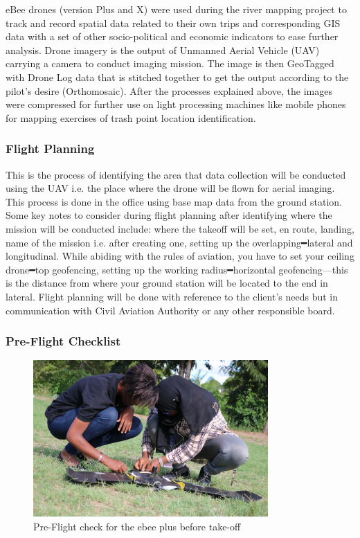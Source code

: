 \documentclass[a4paper,12pt,twoside]{article}
\begin{document}
    \begin{multicols}{2}
    eBee drones (version Plus and X) were used during the river mapping project to track and record spatial data related to their own trips and corresponding GIS data with a set of other socio-political and economic indicators to ease further analysis. Drone imagery is the output of Unmanned Aerial Vehicle (UAV) carrying a camera to conduct imaging mission. The image is then GeoTagged with Drone Log data that is stitched together to get the output according to the pilot’s desire (Orthomosaic). After the processes explained above, the images were compressed for further use on light processing machines like mobile phones for mapping exercises of trash point location identification.
    \end{multicols}
    
    \subsubsection{Flight Planning}
    This is the process of identifying the area that data collection will be conducted using the UAV i.e. the place where the drone will be flown for aerial imaging. This process is done in the office using base map data from the ground station. Some key notes to consider during flight planning after identifying where the mission will be conducted include: where the takeoff will be set, en route, landing, name of the mission i.e. after creating one, setting up the overlapping━lateral and longitudinal. While abiding with the rules of aviation, you have to set your ceiling drone━top geofencing, setting up the working radius━horizontal geofencing---this is the distance from where your ground station will be located to the end in lateral. Flight planning will be done with reference to the client’s needs but in communication with Civil Aviation Authority or any other responsible board.
    
    \subsubsection{Pre-Flight Checklist}
    
         \begin{figure} %
            \centering
            \includegraphics[width=0.8\textwidth]{images/image18.jpg}
            \caption{Pre-Flight check for the ebee plus before take-off}
        \end{figure}
    
\end{document}
